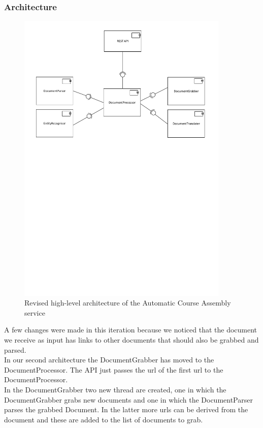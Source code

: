 \documentclass[a4paper,12pt]{article}
\begin{document}
\subsubsection*{Architecture}
\begin{figure}[H]
  \centering
      \includegraphics[width=0.9\textwidth]{design/componentsv2}
  \caption{Revised high-level architecture of the Automatic Course Assembly service}
\label{fig:intelligence}
\end{figure}

A few changes were made in this iteration because we noticed that the document we receive as input has links to other documents that should also be grabbed and parsed.\\

In our second architecture the DocumentGrabber has moved to the DocumentProcessor. The API just passes the url of the first url to the DocumentProcessor.\\
In the DocumentGrabber two new thread are created, one in which the DocumentGrabber grabs new documents and one in which the DocumentParser parses the grabbed Document. In the latter more urls can be derived from the document and these are added to the list of documents to grab.\\
\end{document}
